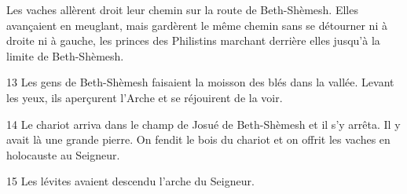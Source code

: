 Les vaches allèrent droit leur chemin sur la route de Beth-Shèmesh. Elles avançaient en meuglant, mais gardèrent le même chemin sans se détourner ni à droite ni à gauche, les princes des Philistins marchant derrière elles jusqu’à la limite de Beth-Shèmesh.

13 Les gens de Beth-Shèmesh faisaient la moisson des blés dans la vallée. Levant les yeux, ils aperçurent l’Arche et se réjouirent de la voir.

14 Le chariot arriva dans le champ de Josué de Beth-Shèmesh et il s’y arrêta. Il y avait là une grande pierre. On fendit le bois du chariot et on offrit les vaches en holocauste au Seigneur.

15 Les lévites avaient descendu l’arche du Seigneur.